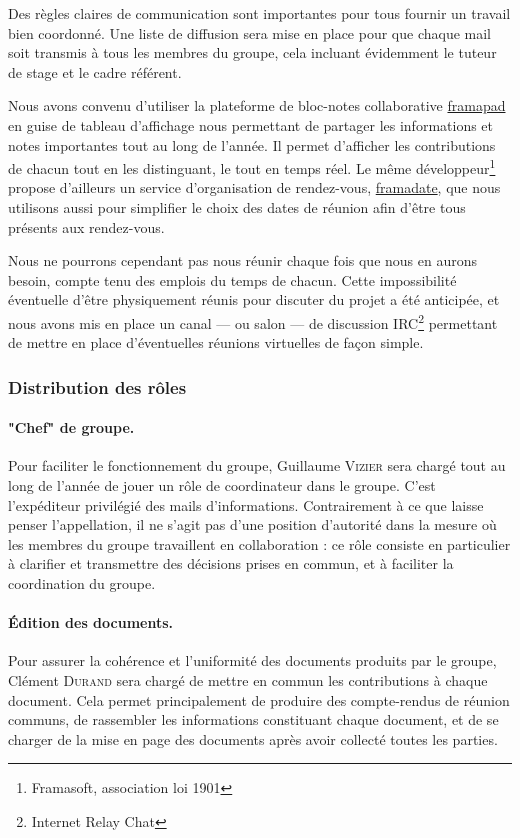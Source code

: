\documentclass[a4paper, 12pt,twoside]{article}
\begin{document}
		Des règles claires de communication sont importantes pour tous fournir un travail bien coordonné. Une liste de diffusion sera mise en place pour que chaque mail soit transmis à tous les membres du groupe, cela incluant évidemment le tuteur de stage et le cadre référent.
		
		Nous avons convenu d'utiliser la plateforme de bloc-notes collaborative \href{https://framapad.org}{framapad} en guise de tableau d'affichage nous permettant de partager les informations et notes importantes tout au long de l'année. Il permet d'afficher les contributions de chacun tout en les distinguant, le tout en temps réel. Le même développeur\footnote{Framasoft, association loi 1901} propose d'ailleurs un service d'organisation de rendez-vous, \href{https://framadate.org}{framadate}, que nous utilisons aussi pour simplifier le choix des dates de réunion afin d'être tous présents aux rendez-vous.
		
		Nous ne pourrons  cependant pas nous réunir chaque fois que nous en aurons besoin, compte tenu des emplois du temps de chacun. Cette impossibilité éventuelle d'être physiquement réunis pour discuter du projet a été anticipée, et nous avons mis en place un canal — ou salon — de discussion IRC\footnote{Internet Relay Chat} permettant de mettre en place d'éventuelles réunions virtuelles de façon simple.
				
		\subsubsection{Distribution des rôles}
		
		\paragraph{"Chef" de groupe. } Pour faciliter le fonctionnement du groupe, \textcolor{bleu303}{Guillaume \textsc{Vizier}} sera chargé tout au long de l'année de jouer un rôle de coordinateur dans le groupe. C'est l'expéditeur privilégié des mails d'informations. Contrairement à ce que laisse penser l'appellation, il ne s'agit pas d'une position d'autorité dans la mesure où les membres du groupe travaillent en collaboration : ce rôle consiste en particulier à clarifier et transmettre des décisions prises en commun, et à faciliter la coordination du groupe.
		
		\paragraph{Édition des documents. } Pour assurer la cohérence et l'uniformité des documents produits par le groupe, \textcolor{bleu303}{Clément \textsc{Durand}} sera chargé de mettre en commun les contributions à chaque document. Cela permet principalement de produire des compte-rendus de réunion communs, de rassembler les informations constituant chaque document, et de se charger de la mise en page des documents après avoir collecté toutes les parties.
		
\end{document}
